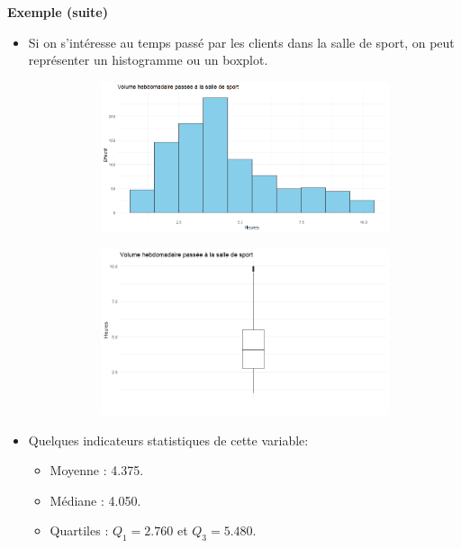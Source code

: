 \documentclass[aspectratio=169,xcolor=dvipsnames]{beamer}
\begin{document}
\begin{frame}
	\begin{exampleblock}{\textbf{Exemple (suite)}}
	\begin{itemize}
	\item Si on s'intéresse au temps passé par les clients dans la salle de sport, on peut représenter un histogramme ou un boxplot.
		\begin{figure}
		\centering
		\begin{subfigure}{0.48\linewidth}
		\includegraphics[scale=0.25]{histo_gym1.png}
		\end{subfigure}
		\begin{subfigure}{0.48\linewidth}
		\includegraphics[scale=0.25]{boxplot_gym1.png}
		\end{subfigure}
		\end{figure}
	\item Quelques indicateurs statistiques de cette variable:
		\begin{itemize}
		\item Moyenne : 4.375.
		\item Médiane : 4.050.
		\item Quartiles : $Q_1=2.760$ et $Q_3 = 5.480$.
		\end{itemize}
	\end{itemize}
	\end{exampleblock}
\end{frame}
\end{document}
